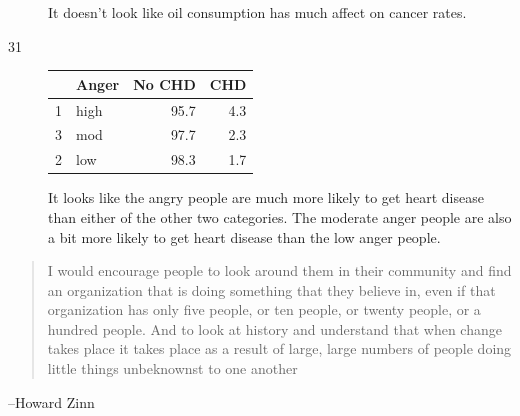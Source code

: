\documentclass[letterpaper, landscape]{exam}
\begin{document}
\begin{description}
      It doesn't look like oil consumption has much affect on cancer rates.

    \item[31]
      \begin{table}[H]
        \centering
        \begin{tabular}{rlrr}
          \toprule
            & Anger & No CHD & CHD \\
          \midrule
          1 & high  & 95.7   & 4.3 \\
          3 & mod   & 97.7   & 2.3 \\
          2 & low   & 98.3   & 1.7 \\
          \bottomrule
        \end{tabular}
      \end{table}

      It looks like the angry people are much more likely to get heart disease than
      either of the other two categories.  The moderate anger people are also a bit
      more likely to get heart disease than the low anger people.

  \end{description}

  \else
    \vspace{10 cm}
    \begin{quote}
      \begin{em}
        I would encourage people to look around them in their community and find an
        organization that is doing something that they believe in, even if that
        organization has only five people, or ten people, or twenty people, or a hundred
        people. And to look at history and understand that when change takes place it
        takes place as a result of large, large numbers of people doing little things
        unbeknownst to one another
      \end{em}
    \end{quote}
    \hspace{1 cm} --Howard Zinn
  \fi
\end{document}
